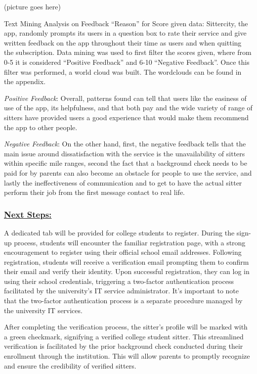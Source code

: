 \documentclass[12pt]{article}
\begin{document}
(picture goes here)

Text Mining Analysis on Feedback ``Reason'' for Score given data:
Sittercity, the app, randomly prompts its users in a question box to
rate their service and give written feedback on the app throughout their
time as users and when quitting the subscription. Data mining was used
to first filter the scores given, where from 0-5 it is considered
``Positive Feedback'' and 6-10 ``Negative Feedback''. Once this filter
was performed, a world cloud was built. The wordclouds can be found in
the appendix.

\emph{Positive Feedback}: Overall, patterns found can tell that users
like the easiness of use of the app, its helpfulness, and that both pay
and the wide variety of range of sitters have provided users a good
experience that would make them recommend the app to other people.

\emph{Negative Feedback}: On the other hand, first, the negative
feedback tells that the main issue around dissatisfaction with the
service is the unavailability of sitters within specific mile ranges,
second the fact that a background check needs to be paid for by parents
can also become an obstacle for people to use the service, and lastly
the ineffectiveness of communication and to get to have the actual
sitter perform their job from the first message contact to real life.

\hypertarget{next-steps}{%
\subsubsection{\texorpdfstring{\uline{\textbf{Next
Steps:}}}{Next Steps:}}\label{next-steps}}

A dedicated tab will be provided for college students to register.
During the sign-up process, students will encounter the familiar
registration page, with a strong encouragement to register using their
official school email addresses. Following registration, students will
receive a verification email prompting them to confirm their email and
verify their identity. Upon successful registration, they can log in
using their school credentials, triggering a two-factor authentication
process facilitated by the university's IT service administrator. It's
important to note that the two-factor authentication process is a
separate procedure managed by the university IT services.

After completing the verification process, the sitter's profile will be
marked with a green checkmark, signifying a verified college student
sitter. This streamlined verification is facilitated by the prior
background check conducted during their enrollment through the
institution. This will allow parents to promptly recognize and ensure
the credibility of verified sitters.
\end{document}

